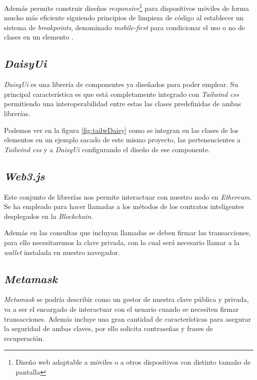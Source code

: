 Además permite construir diseños \textit{responsive}\footnote{Diseño web adaptable a móviles o a otros dispositivos con distinto tamaño de pantalla} para dispositivos móviles de forma mucho más eficiente siguiendo principios de limpieza de código al establecer un sistema de \textit{breakpoints}, denominado \textit{mobile-first} para condicionar el uso o no de clases en un elemento \cite{tailwindcssResponsiveDesign}.

\subsection{\textit{DaisyUi}}
\textit{DaisyUi} es una librería de componentes ya diseñados para poder emplear. Su principal característica es que está completamente integrado con \textit{Tailwind css} permitiendo una interoperabilidad entre estas las clases predefinidas de ambas librerías.


Podemos ver en la figura \ref{fig:tailwDaisy} como se integran en las clases de los elementos en un ejemplo sacado de este mismo proyecto, las pertenencientes a \textit{Tailwind css} y a \textit{DaisyUi} configurando el diseño de ese componente.

\subsection{\textit{Web3.js}}

Este conjunto de librerías \cite{web3jsWeb3jsEthereum} nos permite interactuar con nuestro nodo en \textit{Ethereum}. Se ha empleado para hacer llamadas a los métodos de los contratos inteligentes desplegados en la \textit{Blockchain}.

Además en las consultas que incluyan llamadas se deben firmar las transacciones, para ello necesitaremos la clave privada, con lo cual será necesario llamar a la \textit{wallet} instalada en nuestro navegador.

\subsection{\textit{Metamask}}

\textit{Metamask} \cite{metamaskHomeMetaMask} se podría describir como un gestor de nuestra clave pública y privada, va  a ser el encargado de interactuar con el usuario cuando se necesiten firmar transacciones. Además incluye una gran cantidad de características para asegurar la seguridad de ambas claves, por ello solicita contraseñas y frases de recuperación.

